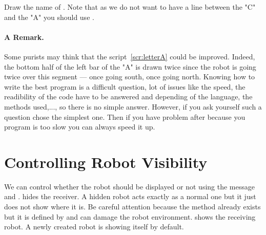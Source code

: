 \begin{exonofig}\label{exo:carosName} 
Draw the name of \caro. Note that as we do not want to have a line between the "C" and the "A" you should use \jump.  
\end{exonofig}

\paragraph{A Remark.}
Some purists  may think that the script~\ref{scr:letterA} could be improved. Indeed, the bottom half of  the left bar of the "A" is drawn twice since the robot is going twice
over this segment --- once going south, once going north. 
Knowing how to write the best program is a difficult question, lot of issues like the speed, the readibility of the code have to be answered and depending of the language, the methods used,..., so there is no simple answer. However, if you ask yourself such a question chose the simplest one.  Then if you have problem after because you program is too slow you can always speed it up.

\section{Controlling Robot Visibility}
We can control whether the robot should be displayed or not using the message   and .  hides the receiver. A hidden robot acts exactly as a normal one but it just does not show where it is. Be careful attention because the method  already exists but it is defined by \sq and can damage the robot environment.  shows the receiving robot. A newly created robot is showing itself by default. 


\summa


